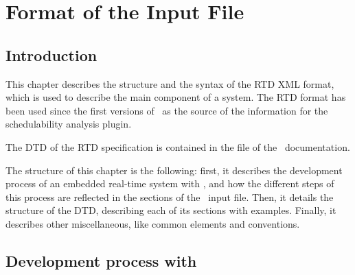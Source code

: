 \chapter{Format of the Input File}
\label{cha:DTD-Input-file}


\section{Introduction}

This chapter describes the structure and the syntax of the RTD XML
format, which is used to describe the main component of a system. The
RTD format has been used since the first versions of \rtd\ as the
source of the information for the schedulability analysis plugin.

The DTD of the RTD specification is contained in the file
 of the \rtd\ documentation.

The structure of this chapter is the following: first, it describes
the development process of an embedded real-time system with \rtd, and
how the different steps of this process are reflected in the sections
of the \rtd\ input file. Then, it details the structure of the DTD,
describing each of its sections with examples. Finally, it describes
other miscellaneous, like common elements and conventions.


\section{Development process with \rtd}

